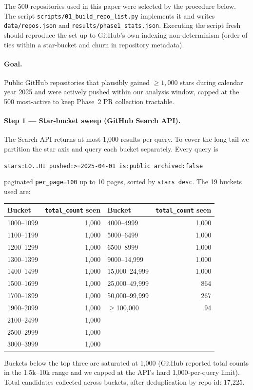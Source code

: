 
The 500 repositories used in this paper were selected by the procedure below. The script \texttt{scripts/01\_build\_repo\_list.py} implements it and writes \texttt{data/repos.json} and \texttt{results/phase1\_stats.json}. Executing the script fresh should reproduce the set up to GitHub's own indexing non-determinism (order of ties within a star-bucket and churn in repository metadata).

\paragraph{Goal.} Public GitHub repositories that plausibly gained $\geq 1{,}000$ stars during calendar year 2025 and were actively pushed within our analysis window, capped at the 500 most-active to keep Phase~2 PR collection tractable.

\paragraph{Step 1 — Star-bucket sweep (GitHub Search API).} The Search API returns at most 1{,}000 results per query. To cover the long tail we partition the star axis and query each bucket separately. Every query is
\begin{center}
\texttt{stars:LO..HI pushed:>=2025-04-01 is:public archived:false}
\end{center}
paginated \texttt{per\_page=100} up to 10 pages, sorted by \texttt{stars desc}. The 19 buckets used are:
\begin{center}\footnotesize
\begin{tabular}{@{}lrlr@{}}
\toprule
Bucket & \texttt{total\_count} seen & Bucket & \texttt{total\_count} seen \\
\midrule
1000--1099 & 1{,}000 & 4000--4999 & 1{,}000 \\
1100--1199 & 1{,}000 & 5000--6499 & 1{,}000 \\
1200--1299 & 1{,}000 & 6500--8999 & 1{,}000 \\
1300--1399 & 1{,}000 & 9000--14{,}999 & 1{,}000 \\
1400--1499 & 1{,}000 & 15{,}000--24{,}999 & 1{,}000 \\
1500--1699 & 1{,}000 & 25{,}000--49{,}999 & 864 \\
1700--1899 & 1{,}000 & 50{,}000--99{,}999 & 267 \\
1900--2099 & 1{,}000 & $\geq$100{,}000 & 94 \\
2100--2499 & 1{,}000 & & \\
2500--2999 & 1{,}000 & & \\
3000--3999 & 1{,}000 & & \\
\bottomrule
\end{tabular}
\end{center}
Buckets below the top three are saturated at 1{,}000 (GitHub reported total counts in the 1.5k--10k range and we capped at the API's hard 1{,}000-per-query limit). Total candidates collected across buckets, after deduplication by repo id: 17{,}225.

